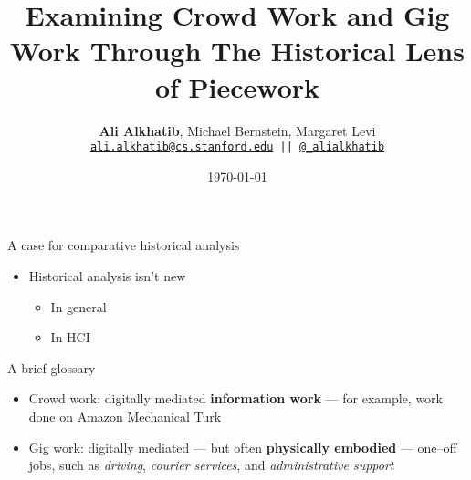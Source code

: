\documentclass{beamer}
\title{Examining Crowd Work and Gig Work Through The Historical Lens of Piecework}
\author{\textbf{Ali Alkhatib},
                Michael Bernstein,
                Margaret Levi\\
\texttt{ \scriptsize{\href{mailto:ali.alkhatib@cs.stanford.edu}{ali.alkhatib@cs.stanford.edu} ||
         \href{http://twitter.com/_alialkhatib}{@\_alialkhatib}} }}
\institute[Stanford]{Stanford University}
\date{\today}
\newcommand{\onlyinsubfile}[1]{#1}
\newcommand{\notinsubfile}[1]{}
\begin{document}
\renewcommand{\onlyinsubfile}[1]{}
\renewcommand{\notinsubfile}[1]{#1}

\begin{frame}
\titlepage
\end{frame}




\begin{frame}{A case for comparative historical analysis}
\begin{itemize}
  \item Historical analysis isn't new
  \begin{itemize}
    \item In general

    \scriptsize{
      \textcite{rosenberg1994exploring,rosenberg1982inside}
    }
    \item In HCI

    \scriptsize{
      \textcite{Wyche2006,bodker1993historical}
    }
  \end{itemize}
\end{itemize}
\end{frame}




\begin{frame}{A brief glossary}
    \begin{itemize}
      \item Crowd work: digitally mediated \textbf{information work}
      --- for example, work done on Amazon Mechanical Turk~\cite{crowdworkFuture}
      \item Gig work: digitally mediated --- but often \textbf{physically embodied} --- one--off jobs,
      such as
      \textit{driving},
      \textit{courier services},
      and \textit{administrative support}~\cite{friedman2014workers,Parigi:2016:GE:3026779.3013496}
    \end{itemize}
\end{frame}



% 
% 
% 


% 
\printbibliography{}
\end{document}
